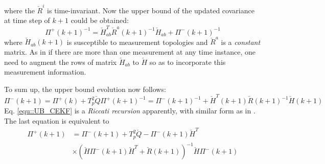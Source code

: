 \documentclass[conference]{IEEEtran}
\begin{document}
where the $\check{R}^i$ is time-invariant.
Now the upper bound of the updated covariance at time step of $k+1$ could be obtained:
\begin{equation}
\Pi ^{+}(k+1)^{-1} = \check{H}^T_{ab}\check{R}^{a}(k+1)^{-1}\check{H}_{ab} + \Pi ^{-}(k+1)^{-1}
\end{equation}
where $\check{H}_{ab}(k+1)$ is susceptible to measurement topologies and $\check{R}^a$ is a \emph{constant} matrix.
As in \cite{mourikis2006performance,chang2018optimal,chang2018controltheoretical} if there are more than one measurement at any time instance, one need to augment the rows of matrix $\check{H}_{ab}$ to $\check{H}$ so as to incorporate this measurement information.

To sum up, the upper bound evolution now follows:
\begin{subequations}
	\begin{equation}
	\Pi^{-}(k+1) =\Pi^{+}(k) + T_p^2\check{Q}
	\end{equation}
	\begin{equation}
	\Pi ^{+}(k+1)^{-1} = \Pi ^{-}(k+1)^{-1} + \check{H}^T(k+1)\check{R}(k+1)^{-1}\check{H}(k+1)
	\end{equation}
	\label{equ::UB_CEKF}
\end{subequations}
Eq. \eqref{equ::UB_CEKF} is a \emph{Riccati recursion} apparently, with similar form as in \cite{mourikis2006performance,chang2018optimal,chang2018controltheoretical}.
The last equation is equivalent to
\begin{equation}
\begin{split}	
	\Pi ^{+}(k+1) &= \Pi ^{-}(k+1) + T_p^2\check{Q} - \Pi ^{-}(k+1) \check{H}^T \\
	&\times (\check{H} \Pi ^{-}(k+1)\check{H}^T +  \check{R}(k+1))^{-1} \check{H} \Pi ^{-}(k+1)
\end{split}
\end{equation}
\end{document}
